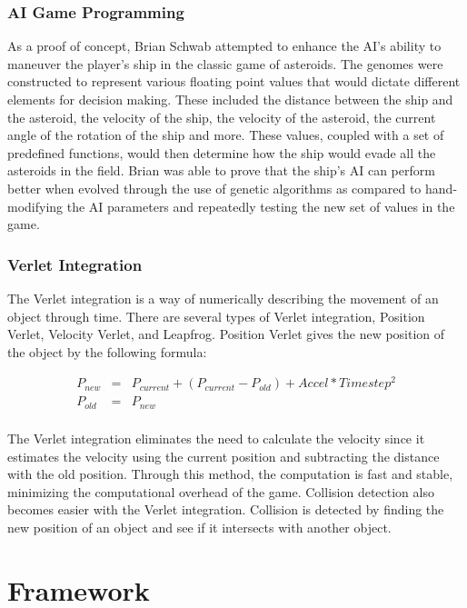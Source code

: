 \documentclass{acm_proc_article-sp}
\begin{document}
\subsubsection{AI Game Programming}
As a proof of concept, Brian Schwab attempted to enhance the AI's ability to maneuver
the player's ship in the classic game of asteroids\cite{Schwab04}. The genomes were
constructed to represent various floating point values that would dictate different
elements for decision making. These included the distance between the ship and the asteroid,
the velocity of the ship, the velocity of the asteroid, the current angle of the rotation
of the ship and more. These values, coupled with a set of predefined functions, would then
determine how the ship would evade all the asteroids in the field. Brian was able to prove
that the ship's AI can perform better when evolved through the use of genetic algorithms as
compared to hand-modifying the AI parameters and repeatedly testing the new set of values in
the game.

\subsubsection{Verlet Integration}
The Verlet integration is a way of numerically describing  the movement of an object through
time\cite{website:Bitterli09}. There are several types of Verlet integration,
Position Verlet, Velocity 
Verlet, and Leapfrog. Position Verlet gives the new position of the object by the following 
formula:

\begin{eqnarray}
P_{new}  & = &
P_{current} + 
(P_{current} - P_{old}) +
Accel * Timestep^2 \nonumber \\
P_{old} & = & P_{new} \nonumber \\
\label{Verlet}
\end{eqnarray}

The Verlet integration eliminates the need to calculate the velocity since it estimates 
the velocity using the current position and subtracting the distance with the old position. 
Through this method, the computation is fast and stable, minimizing the computational
overhead of the game. Collision detection also becomes easier with the Verlet integration.
Collision is detected by finding the new position of an object and see if it intersects with
another object.

\section{Framework}
\end{document}
